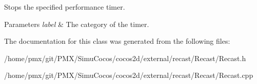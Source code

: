 Stops the specified performance timer. 
\begin{DoxyParams}{Parameters}
{\em label} & The category of the timer. \\
\hline
\end{DoxyParams}


The documentation for this class was generated from the following files\+:\begin{DoxyCompactItemize}
\item 
/home/pmx/git/\+P\+M\+X/\+Simu\+Cocos/cocos2d/external/recast/\+Recast/Recast.\+h\item 
/home/pmx/git/\+P\+M\+X/\+Simu\+Cocos/cocos2d/external/recast/\+Recast/Recast.\+cpp\end{DoxyCompactItemize}
